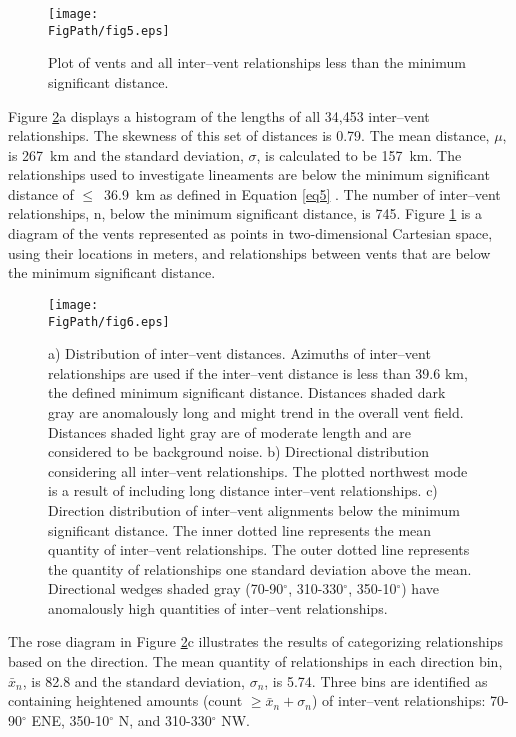 \begin{figure}
\centering
\texttt{[image: \\FigPath/fig5.eps]}
\caption{Plot of vents and all inter--vent relationships less than the minimum significant distance.}
\label{fig-azmap}
\end{figure}

Figure \ref{fig-azgraphs}a displays a histogram of the lengths of all 34,453 inter--vent relationships. The skewness of this set of distances is 0.79. The mean distance, $\mu$, is 267~km and the standard deviation, $\sigma$, is calculated to be 157~km. The relationships used to investigate lineaments are below the minimum significant distance of $\le$~36.9~km as defined in Equation \ref{eq5} \citep{Cebria2011}. The number of inter--vent relationships, n, below the minimum significant distance, is 745. Figure \ref{fig-azmap} is a diagram of the vents represented as points in two-dimensional Cartesian space, using their locations in meters, and relationships between vents that are below the minimum significant distance.


\begin{figure}
\centering
\texttt{[image: \\FigPath/fig6.eps]}
\caption[Distribution of inter--vent distances and directional distribution considering all inter--vent relationships]{a) Distribution of inter--vent distances. Azimuths of inter--vent relationships are used if the inter--vent distance is less than 39.6 km, the defined minimum significant distance. Distances shaded dark gray are anomalously long and might trend in the overall vent field. Distances shaded light gray are of moderate length and are considered to be background noise. b) Directional distribution considering all inter--vent relationships. The plotted northwest mode is a result of including long distance inter--vent relationships. c) Direction distribution of inter--vent alignments below the minimum significant distance. The inner dotted line represents the mean quantity of inter--vent relationships. The outer dotted line represents the quantity of relationships one standard deviation above the mean. Directional wedges shaded gray (70-90$^{\circ}$, 310-330$^{\circ}$, 350-10$^{\circ}$) have anomalously high quantities of inter--vent relationships.}
\label{fig-azgraphs}
\end{figure}

The rose diagram in Figure \ref{fig-azgraphs}c illustrates the results of categorizing relationships based on the direction. The mean quantity of relationships in each direction bin, $\bar{x}_n$, is 82.8 and the standard deviation, $\sigma_n$, is 5.74. Three bins are identified as containing heightened amounts (count $\ge \bar{x}_n + \sigma_n$) of inter--vent relationships: 70-90$^{\circ}$ ENE, 350-10$^{\circ}$ N, and 310-330$^{\circ}$ NW.

